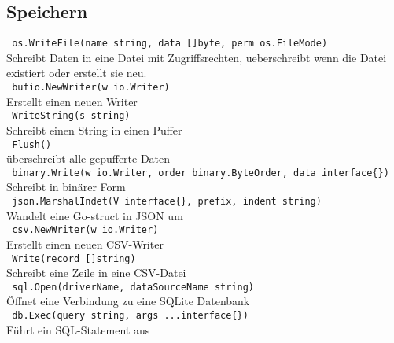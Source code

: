 \documentclass[twoside,a4paper,12pt]{article}
\begin{document}
\subsection{Speichern}
\verb| os.WriteFile(name string, data []byte, perm os.FileMode) | \\ 
Schreibt Daten in eine Datei mit Zugriffsrechten, ueberschreibt wenn die Datei \\ 
existiert oder erstellt sie neu. \\ 
\verb| bufio.NewWriter(w io.Writer) | \\ 
Erstellt einen neuen Writer \\ 
\verb| WriteString(s string) | \\ 
Schreibt einen String in einen Puffer \\ 
\verb| Flush() | \\ 
überschreibt alle gepufferte Daten \\ 
\verb| binary.Write(w io.Writer, order binary.ByteOrder, data interface{}) | \\ 
Schreibt in binärer Form \\ 
\verb| json.MarshalIndet(V interface{}, prefix, indent string) | \\ 
Wandelt eine Go-struct in JSON um \\ 
\verb| csv.NewWriter(w io.Writer) | \\ 
Erstellt einen neuen CSV-Writer \\ 
\verb| Write(record []string) | \\ 
Schreibt eine Zeile in eine CSV-Datei \\ 
\verb| sql.Open(driverName, dataSourceName string) | \\ 
Öffnet eine Verbindung zu eine SQLite Datenbank \\ 
\verb| db.Exec(query string, args ...interface{}) | \\ 
Führt ein SQL-Statement aus \\ 
\end{document}
